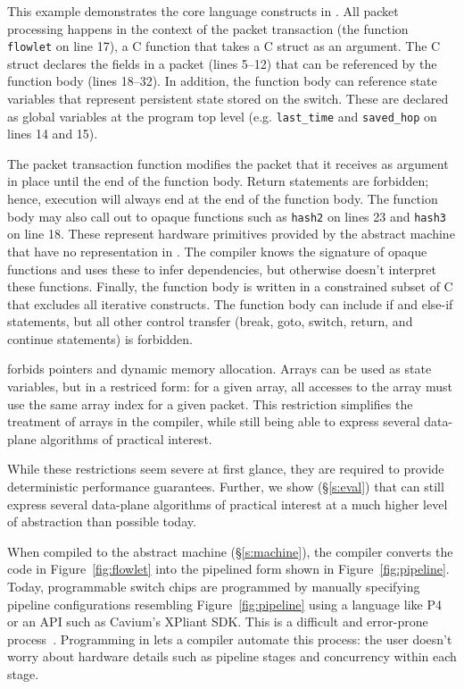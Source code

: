 This example demonstrates the core language constructs in \pktlanguage. All
packet processing happens in the context of the packet transaction (the
function \texttt{flowlet} on line 17), a C function that takes a C struct as an
argument. The C struct declares the fields in a packet (lines 5--12) that can
be referenced by the function body (lines 18--32).  In addition, the function
body can reference state variables that represent persistent state stored on
the switch. These are declared as global variables at the program top level
(e.g. \texttt{last\_time} and \texttt{saved\_hop} on lines 14 and 15).

The packet transaction function modifies the packet that
it receives as argument in place until the end of the function body. Return
statements are forbidden; hence, execution will always end at the end of
the function body. The function body may also call out to opaque functions such
as \texttt{hash2} on lines 23 and \texttt{hash3} on line 18. These
represent hardware primitives provided by the abstract machine that have no
representation in \pktlanguage. The \pktlanguage compiler knows the signature
of opaque functions and uses these to infer dependencies, but otherwise doesn't
interpret these functions. Finally, the function body is written in a
constrained subset of C that excludes all iterative constructs. The function
body can include if and else-if statements, but all other control transfer
(break, goto, switch, return, and continue statements) is forbidden.

\pktlanguage forbids pointers and dynamic memory allocation. Arrays can be used
as state variables, but in a restriced form: for a given array, all accesses to
the array must use the same array index for a given packet. This restriction
simplifies the treatment of arrays in the compiler, while still being able to
express several data-plane algorithms of practical interest.

While these restrictions seem severe at first glance, they are required to
provide deterministic performance guarantees. Further, we show (\S\ref{s:eval})
that \pktlanguage can still express several data-plane algorithms  of practical
interest at a much higher level of abstraction than possible today.

When compiled to the \absmachine abstract machine (\S\ref{s:machine}), the
\pktlanguage compiler converts the code in Figure~\ref{fig:flowlet} into the
pipelined form shown in Figure~\ref{fig:pipeline}. Today, programmable switch
chips are programmed by manually specifying pipeline configurations resembling
Figure~\ref{fig:pipeline} using a language like P4 or an API such as Cavium's
XPliant SDK. This is a difficult and error-prone process~\cite{p4-semantics}.
Programming in \pktlanguage lets a compiler automate this process:
the user doesn't worry about hardware details such as pipeline stages and
concurrency within each stage.
